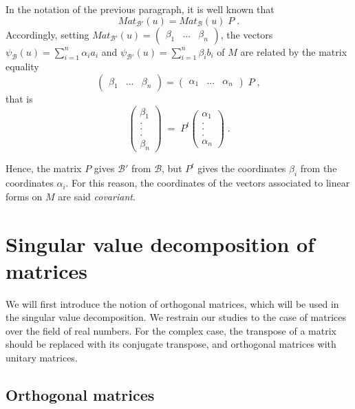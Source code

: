 \documentclass{report}
\theoremstyle{definition}
\theoremstyle{remark}
\begin{document}
\begin{enumerate}
In the notation of the previous paragraph, it is well known that 
$$Mat_{\mathcal{B}'}(u)=Mat_{\mathcal{B}}(u)\;P\;.$$
Accordingly, setting $Mat_{\mathcal{B}'}(u)=\begin{pmatrix}\beta_1&...&\beta_n\end{pmatrix}$, the vectors $\psi_{\mathcal{B}}(u)=\sum_{i=1}^{n} \alpha_ia_i$ and $\psi_{\mathcal{B}'}(u)=\sum_{i=1}^{n} \beta_ib_i$ of $M$ are related by the matrix equality
$$\begin{pmatrix}\beta_1&...&\beta_n\end{pmatrix}=\begin{pmatrix}\alpha_1&...&\alpha_n\end{pmatrix}\;P\;,$$
that is 
 $$\begin{pmatrix}\beta_1\\.\\.\\.\\\beta_n\end{pmatrix}\;=\;P^{t}\begin{pmatrix}\alpha_1\\.\\.\\.\\\alpha_n\end{pmatrix}\;.$$

 
  Hence, the matrix $P$ gives $\mathcal{B}'$ from $\mathcal{B}$, but $P^{t}$ gives the coordinates $\beta_i$ from the coordinates $\alpha_i$. For this reason, the coordinates of the vectors associated to linear forms on $M$ are said \textit{covariant}.

\end{enumerate}

\section{Singular value decomposition of matrices}

We will first introduce the notion of orthogonal matrices, which will be used in the singular value decomposition. We restrain our studies to the case of matrices over the field of real numbers. For the complex case, the transpose of a matrix should be replaced with its conjugate transpose, and orthogonal matrices with unitary matrices. 

\subsection{Orthogonal matrices}
\end{document}
